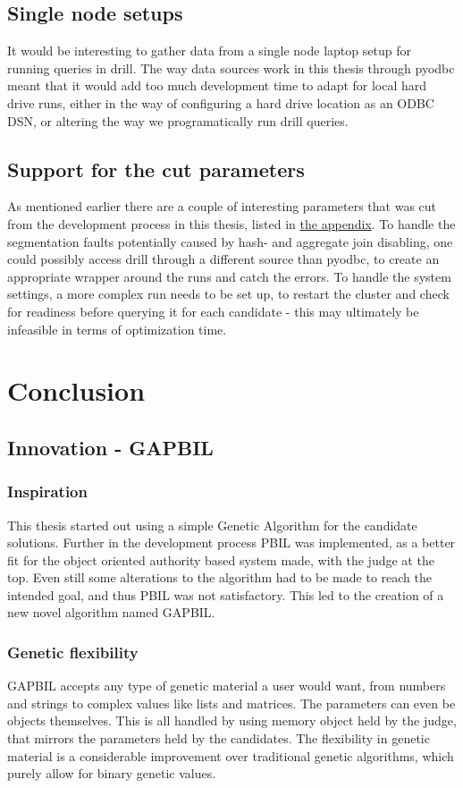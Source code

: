 \documentclass[a4paper,english]{report}
\begin{document}
	\section{Single node setups}
	It would be interesting to gather data from a single node laptop setup for running queries in drill. The way data sources work in this thesis through pyodbc meant that it would add too much development time to adapt for local hard drive runs, either in the way of configuring a hard drive location as an ODBC DSN, or altering the way we programatically run drill queries. 
	\section{Support for the cut parameters}
	As mentioned earlier there are a couple of interesting parameters that was cut from the development process in this thesis, listed in \hyperref[table:removed_params]{the appendix}. To handle the segmentation faults potentially caused by hash- and aggregate join disabling, one could possibly access drill through a different source than pyodbc, to create an appropriate wrapper around the runs and catch the errors. To handle the system settings, a more complex run needs to be set up, to restart the cluster and check for readiness before querying it for each candidate - this may ultimately be infeasible in terms of optimization time.
	
	\chapter{Conclusion}
	\section{Innovation - GAPBIL}
		\subsection{Inspiration}
		This thesis started out using a simple Genetic Algorithm for the candidate solutions. Further in the development process PBIL was implemented, as a better fit for the object oriented authority based system made, with the judge at the top. Even still some alterations to the algorithm had to be made to reach the intended goal, and thus PBIL was not satisfactory. This led to the creation of a new novel algorithm named GAPBIL.
		\subsection{Genetic flexibility}
		GAPBIL accepts any type of genetic material a user would want, from numbers and strings to complex values like lists and matrices. The parameters can even be objects themselves. This is all handled by using memory object held by the judge, that mirrors the parameters held by the candidates. The flexibility in genetic material is a considerable improvement over traditional genetic algorithms, which purely allow for binary genetic values.
\end{document}
